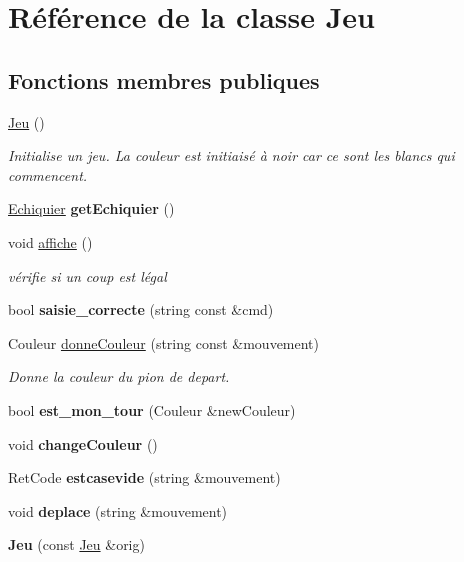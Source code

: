 \hypertarget{classJeu}{}\section{Référence de la classe Jeu}
\label{classJeu}
\subsection*{Fonctions membres publiques}
\begin{DoxyCompactItemize}
\item 
\mbox{\label{classJeu_acc5795ee00edf75516d3dfe65be3e6d6}} 
\hyperlink{classJeu_acc5795ee00edf75516d3dfe65be3e6d6}{Jeu} ()
\begin{DoxyCompactList}\small\item\em Initialise un jeu. La couleur est initiaisé à noir car ce sont les blancs qui commencent. \end{DoxyCompactList}\item 
\mbox{\label{classJeu_a969b745f1cab9bcef9d7b92945edd9e7}} 
\hyperlink{classEchiquier}{Echiquier} {\bfseries get\+Echiquier} ()
\item 
void \hyperlink{classJeu_a7931f8054847abc19e33e73967a3807e}{affiche} ()
\begin{DoxyCompactList}\small\item\em vérifie si un coup est légal \end{DoxyCompactList}\item 
\mbox{\label{classJeu_a81ec468a5a1498dac07cf0a6e6c09c76}} 
bool {\bfseries saisie\+\_\+correcte} (string const \&cmd)
\item 
Couleur \hyperlink{classJeu_a3cc5aa35c3ee56ab4bbf6f8be660963c}{donne\+Couleur} (string const \&mouvement)
\begin{DoxyCompactList}\small\item\em Donne la couleur du pion de depart. \end{DoxyCompactList}\item 
\mbox{\label{classJeu_a25b66c0784ef1729fdc3bb00b6f478af}} 
bool {\bfseries est\+\_\+mon\+\_\+tour} (Couleur \&new\+Couleur)
\item 
\mbox{\label{classJeu_a020c0ada993c31e61e19ddaed5c97712}} 
void {\bfseries change\+Couleur} ()
\item 
\mbox{\label{classJeu_a2b0ca27103365b72428ecab5b16a27a6}} 
Ret\+Code {\bfseries estcasevide} (string \&mouvement)
\item 
\mbox{\label{classJeu_aa7e58581f881d83bbc13574f20423822}} 
void {\bfseries deplace} (string \&mouvement)
\item 
\mbox{\label{classJeu_ae853996b9382f560aa3d13b37b41c99c}} 
{\bfseries Jeu} (const \hyperlink{classJeu}{Jeu} \&orig)
\end{DoxyCompactItemize}


